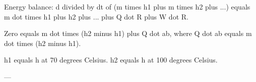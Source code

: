 Energy balance:  
d divided by dt of (m times h1 plus m times h2 plus ...) equals m dot times h1 plus h2 plus ... plus Q dot R plus W dot R.  

Zero equals m dot times (h2 minus h1) plus Q dot ab, where Q dot ab equals m dot times (h2 minus h1).  

h1 equals h at 70 degrees Celsius.  
h2 equals h at 100 degrees Celsius.  

---